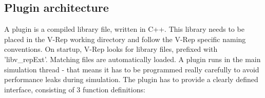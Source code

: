 

\subsection{Plugin architecture}

A plugin is a compiled library file, written in C++. This library needs to be placed in the V-Rep working directory and follow the V-Rep specific naming conventions. On startup, V-Rep looks for library files, prefixed with 'libv\_repExt'. Matching files are automatically loaded. A plugin runs in the main simulation thread -  that means it has to be programmed really carefully to avoid performance leaks during simulation. The plugin has to provide a clearly defined interface, consisting of 3 function definitions:

